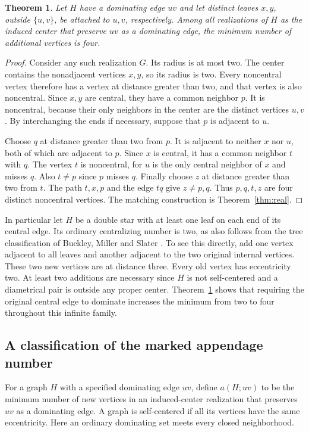 \documentclass[11pt]{article}
\newtheorem{thm}{Theorem}[section]
\begin{document}
\begin{thm}\label{thm:obstruction}
Let $H$ have a dominating edge $uv$ and let distinct leaves $x,y$, outside
$\{u,v\}$, be attached to $u,v$, respectively. Among all realizations of
$H$ as the induced center that preserve $uv$ as a dominating edge, the
minimum number of additional vertices is four.
\end{thm}
\begin{proof}
Consider any such realization $G$. Its radius is at most two. The center
contains the nonadjacent vertices $x,y$, so its radius is two. Every
noncentral vertex therefore has a vertex at distance greater than two,
and that vertex is also noncentral. Since $x,y$ are central, they have a
common neighbor $p$. It is noncentral, because their only neighbors in the
center are the distinct vertices $u,v$. By interchanging the ends if
necessary, suppose that $p$ is adjacent to $u$.

Choose $q$ at distance greater than two from $p$. It is adjacent to
neither $x$ nor $u$, both of which are adjacent to $p$. Since $x$ is
central, it has a common neighbor $t$ with $q$. The vertex $t$ is
noncentral, for $u$ is the only central neighbor of $x$ and misses $q$.
Also $t\ne p$ since $p$ misses $q$. Finally choose $z$ at distance greater
than two from $t$. The path $t,x,p$ and the edge $tq$ give $z\ne p,q$.
Thus $p,q,t,z$ are four distinct noncentral vertices. The matching
construction is Theorem~\ref{thm:real}.
\end{proof}

In particular let $H$ be a double star with at least one leaf on each end
of its central edge. Its ordinary centralizing number is two, as also
follows from the tree classification of Buckley, Miller and Slater
\cite{bms,behrens}. To see this directly, add one vertex adjacent to all
leaves and another adjacent to the two original internal vertices. These
two new vertices are at distance three. Every old vertex has eccentricity
two. At least two additions are necessary since $H$ is not self-centered
and a diametrical pair is outside any proper center. Theorem~\ref{thm:obstruction}
shows that requiring the original central edge to dominate increases the
minimum from two to four throughout this infinite family.


\subsection{A classification of the marked appendage number}
For a graph $H$ with a specified dominating edge $uv$, define $a(H;uv)$
to be the minimum number of new vertices in an induced-center realization
that preserves $uv$ as a dominating edge. A graph is self-centered if all
its vertices have the same eccentricity. Here an ordinary dominating set
meets every closed neighborhood.
\end{document}
